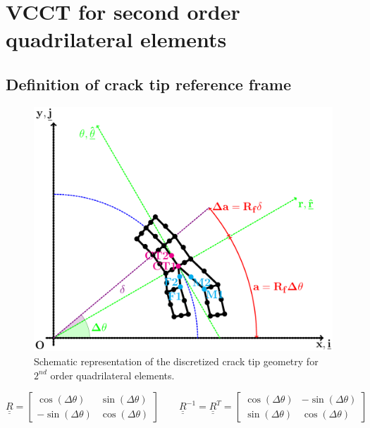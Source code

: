 \documentclass[a4paper]{jpconf}
\begin{document}
\section{VCCT for second order quadrilateral elements}

\subsection{Definition of crack tip reference frame}

\begin{figure}[!h]
\includegraphics[width=\textwidth]{VCCT-quadratic.pdf}
\caption{Schematic representation of the discretized crack tip geometry for $2^{nd}$ order quadrilateral elements.}
\end{figure}

\begin{equation}
\underline{\underline{R}}=\begin{bmatrix}
\cos\left(\Delta\theta\right) & \sin\left(\Delta\theta\right) \\
-\sin\left(\Delta\theta\right) & \cos\left(\Delta\theta\right)
\end{bmatrix}\qquad\underline{\underline{R}}^{-1}=\underline{\underline{R}}^{T}=\begin{bmatrix}
\cos\left(\Delta\theta\right) & -\sin\left(\Delta\theta\right) \\
\sin\left(\Delta\theta\right) & \cos\left(\Delta\theta\right)
\end{bmatrix}
\end{equation}
\end{document}
